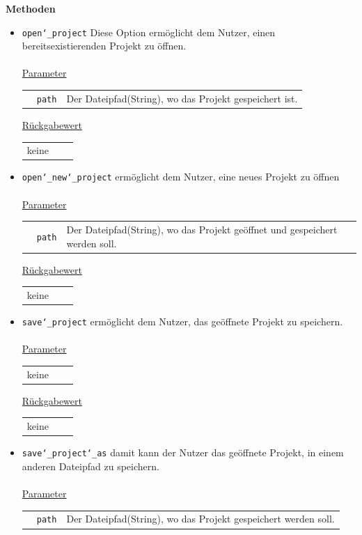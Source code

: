 \documentclass{article}
\begin{document}
\textbf{{Methoden}}
\begin{itemize}
\item \texttt{open\char`_project} \newline Diese Option ermöglicht dem Nutzer, einen bereitsexistierenden Projekt zu öffnen.
\\\\
\underline{{Parameter}}
\begin{tabular}{lll}
 & \texttt{path} & Der Dateipfad(String), wo das Projekt gespeichert ist. \\
\end{tabular}

\underline{{Rückgabewert}}
\begin{tabular}{lll}
 keine \\
\end{tabular}

\item \texttt{open\char`_new\char`_project} \newline ermöglicht dem Nutzer, eine neues Projekt zu öffnen
\\\\
\underline{{Parameter}}
\begin{tabular}{lll}
 & \texttt{path} & Der Dateipfad(String), wo das Projekt geöffnet und gespeichert werden soll. \\
\end{tabular}

\underline{{Rückgabewert}}
\begin{tabular}{lll}
 keine \\
\end{tabular}

\item \texttt{save\char`_project} \newline ermöglicht dem Nutzer, das geöffnete Projekt zu speichern.
\\\\
\underline{{Parameter}}
\begin{tabular}{lll}
 keine \\
\end{tabular}

\underline{{Rückgabewert}}
\begin{tabular}{lll}
 keine \\
\end{tabular}

\item \texttt{save\char`_project\char`_as} \newline damit kann der Nutzer das geöffnete Projekt, in einem  anderen Dateipfad zu speichern.
\\\\
\underline{{Parameter}}
\begin{tabular}{lll}
 & \texttt{path} & Der Dateipfad(String), wo das Projekt gespeichert werden soll. \\
\end{tabular}


\end{itemize}
\end{document}
